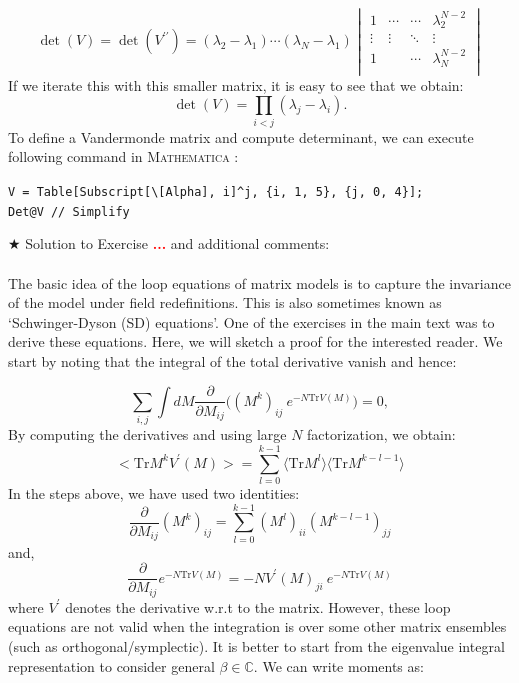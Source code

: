 \documentclass[11pt]{article}
\newcommand{\TODO}[1]{\textcolor{red}{{\bf #1}}}
\newcommand{\MA}{\textsc{Mathematica }}
\begin{document}
\begin{equation}
	\det(V) = \det(V^{\prime\prime}) = 
	(\lambda_2 - \lambda_1) \cdots (\lambda_N - \lambda_1)
	\begin{vmatrix}
		1 & \cdots & \cdots & \lambda_2^{N-2} \\ 
		\vdots  & \vdots  & \ddots & \vdots  \\
		1 &  & \cdots &  \lambda_N^{N-2} \\
	\end{vmatrix}
\end{equation}
If we iterate this with this smaller matrix, it is easy to see that we obtain:
\begin{equation}
	\det(V) = \prod_{i<j} (\lambda_j - \lambda_i).
\end{equation}
To define a Vandermonde matrix and compute determinant, we can execute following command in \MA:
\begin{mdframed}[backgroundcolor=magenta!2]
	\begin{footnotesize} 
		\verb"V = Table[Subscript[\[Alpha], i]^j, {i, 1, 5}, {j, 0, 4}];"\\ 
		\verb"Det@V // Simplify"
	\end{footnotesize} 
\end{mdframed}


\noindent $\bigstar$ Solution to Exercise \TODO{...} and additional comments: 
\\ \\ 
The basic idea of the loop equations of matrix models is to capture the invariance of the model under field redefinitions. This is also sometimes known as `Schwinger-Dyson (SD) equations'. One of the exercises in the main text was to derive these equations. Here, we will sketch a proof for the interested reader. We start by noting that the integral of the total derivative vanish and hence:

\begin{equation}
	\sum_{i,j} \int dM \frac{\partial}{\partial M_{ij}} \Bigg( (M^k)_{ij}~e^{-N\mathrm{Tr} V(M)}\Bigg) = 0, 
\end{equation}
By computing the derivatives and using large $N$ factorization, we obtain:
\begin{equation}
	\Big< \mathrm{Tr} M^{k} V^{\prime}(M) \Big> = \sum_{l=0}^{k-1} \langle \mathrm{Tr} M^{l} \rangle  \langle \mathrm{Tr} M^{k-l-1} \rangle
\end{equation}
In the steps above, we have used two identities:
\begin{equation}
	\frac{\partial}{\partial M_{ij}} (M^{k})_{ij} = \sum_{l=0}^{k-1} (M^{l})_{ii} (M^{k-l-1})_{jj}
\end{equation}
and, 
\begin{equation}
	\frac{\partial}{\partial M_{ij}} e^{-N\mathrm{Tr} V(M)} = -N V^{\prime}(M)_{ji}~e^{-N\mathrm{Tr} V(M)}
\end{equation}
where $V^{\prime}$ denotes the derivative w.r.t to the matrix. 
However, these loop equations are not valid when the integration is over some other matrix ensembles (such as orthogonal/symplectic). It is better to start from the eigenvalue integral representation to consider general $\beta \in \mathbb{C}$. We can write moments as:
\end{document}
